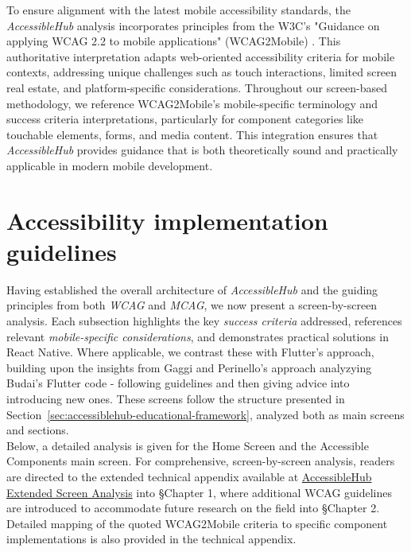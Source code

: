 To ensure alignment with the latest mobile accessibility standards, the \textit{AccessibleHub} analysis incorporates principles from the W3C's "Guidance on applying WCAG 2.2 to mobile applications" (WCAG2Mobile) \cite{w3c-wcag2mobile}. This authoritative interpretation adapts web-oriented accessibility criteria for mobile contexts, addressing unique challenges such as touch interactions, limited screen real estate, and platform-specific considerations. Throughout our screen-based methodology, we reference WCAG2Mobile's mobile-specific terminology and success criteria interpretations, particularly for component categories like touchable elements, forms, and media content. This integration ensures that \textit{AccessibleHub} provides guidance that is both theoretically sound and practically applicable in modern mobile development. 

\section{Accessibility implementation guidelines}
\label{sec:implementation-guidelines}

Having established the overall architecture of \textit{AccessibleHub} and the guiding principles from both \textit{WCAG} and \textit{MCAG}, we now present a screen-by-screen analysis. Each subsection highlights the key \textit{success criteria} addressed, references relevant \textit{mobile-specific considerations}, and demonstrates practical solutions in React Native. Where applicable, we contrast these with Flutter's approach, building upon the insights from Gaggi and Perinello's approach \cite{budai2024mobile} analyzying Budai's Flutter code - following guidelines and then giving advice into introducing new ones. These screens follow the structure presented in Section~\ref{sec:accessiblehub-educational-framework}, analyzed both as main screens and sections. \\ 

Below, a detailed analysis is given for the Home Screen and the Accessible Components main screen. For comprehensive, screen-by-screen analysis, readers are directed to the extended technical appendix available at \href{https://github.com/gabrielrovesti/AccessibleHub/blob/main/Technical\%20Thesis\%20Appendix/AccessibleHub\%20-\%20Extended\%20screen\%20analysis.pdf}{AccessibleHub Extended Screen Analysis} into §Chapter 1, where additional WCAG guidelines are introduced to accommodate future research on the field into §Chapter 2. Detailed mapping of the quoted WCAG2Mobile criteria to specific component implementations is also provided in the technical appendix.

